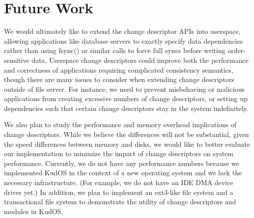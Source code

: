 \preparagraphspacing{}
\section*{Future Work}
\label{sec:future}

We would ultimately like to extend the change descriptor APIs into
userspace, allowing applications like database servers to exactly
specify data dependencies rather than using fsync() or similar calls
to force full syncs before writing order-sensitive data. Userspace
change descriptors could improve both the performance and correctness
of applications requiring complicated consistency semantics, though
there are many issues to consider when extending change descriptors
outside of file server. For instance, we need to prevent misbehaving
or malicious applications from creating excessive numbers of change
descriptors, or setting up dependencies such that certain change
descriptors stay in the system indefinitely.

We also plan to study the performance and memory overhead implications
of change descriptors. While we believe the differences will not be
substantial, given the speed differences between memory and disks, we
would like to better evaluate our implementation to minimize the impact
of change descriptors on system performance. Currently, we do not have
any performance numbers because we implemented KudOS in the context of
a new operating system and we lack the necessary infrastructure.
(For example, we do not have an IDE DMA device driver yet.)
In addition, we plan to implement an ext3-like file system and a
transactional file system to demonstrate the utility of change
descriptors and modules in KudOS.
